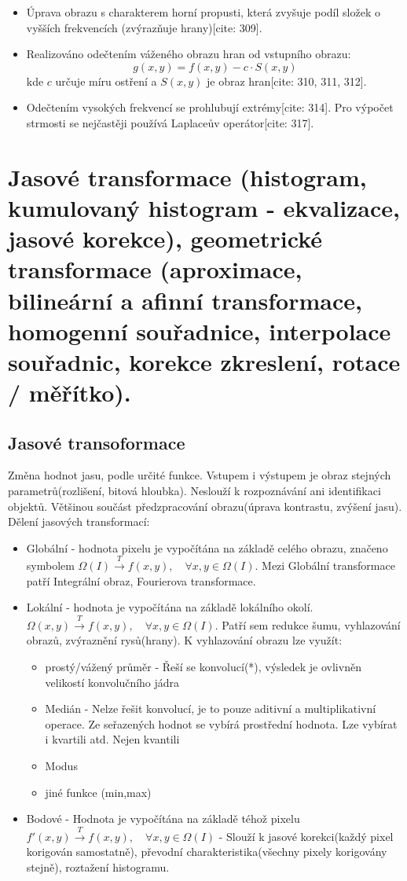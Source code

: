 \begin{itemize}
    \item Úprava obrazu s charakterem horní propusti, která zvyšuje podíl složek o vyšších frekvencích (zvýrazňuje hrany)[cite: 309].
    \item Realizováno odečtením váženého obrazu hran od vstupního obrazu:
    \begin{equation}
        g(x,y) = f(x,y) - c \cdot S(x,y)
    \end{equation}
    kde $c$ určuje míru ostření a $S(x,y)$ je obraz hran[cite: 310, 311, 312].
    \item Odečtením vysokých frekvencí se prohlubují extrémy[cite: 314]. Pro výpočet strmosti se nejčastěji používá Laplaceův operátor[cite: 317].
\end{itemize}
    
\section{Jasové transformace (histogram, kumulovaný histogram - ekvalizace, jasové korekce), geometrické transformace
(aproximace, bilineární a afinní transformace, homogenní souřadnice, interpolace souřadnic, korekce zkreslení, rotace /
měřítko).}
\subsection{Jasové transoformace}
Změna hodnot jasu, podle určité funkce. Vstupem i výstupem je obraz stejných parametrů(rozlišení, bitová hloubka). 
Neslouží k rozpoznávání ani identifikaci objektů. Většinou součást předzpracování obrazu(úprava kontrastu, zvýšení jasu). 
Dělení jasových transformací:
\begin{itemize}
    \item Globální - hodnota pixelu je vypočítána na základě celého obrazu, značeno symbolem $\Omega(I) \xrightarrow{T} f(x, y), \quad \forall x, y \in \Omega(I)$. Mezi Globální
    transformace patří Integrální obraz, Fourierova transformace. 
    \item Lokální - hodnota je vypočítána na základě lokálního okolí. $\Omega(x,y) \xrightarrow{T} f(x, y), \quad \forall x, y \in \Omega(I)$. Patří sem redukce šumu, vyhlazování
    obrazů, zvýraznění rysů(hrany).  K vyhlazování obrazu lze využít:
    \begin{itemize}
        \item prostý/vážený průměr - Řeší se konvolucí(*), výsledek je ovlivněn velikostí konvolučního jádra
        \item Medián - Nelze řešit konvolucí, je to pouze aditivní a multiplikativní operace. Ze seřazených hodnot se vybírá prostřední hodnota. Lze vybírat i kvartili atd. Nejen kvantili
        \item Modus  
        \item jiné funkce (min,max)
    \end{itemize}
    \item Bodové - Hodnota je vypočítána na základě téhož pixelu $f'(x, y) \xrightarrow{T} f(x, y), \quad \forall x, y \in \Omega(I)$ - Slouží k jasové korekci(každý pixel korigován 
    samostatně), převodní charakteristika(všechny pixely korigovány stejně), roztažení histogramu.  
\end{itemize}
